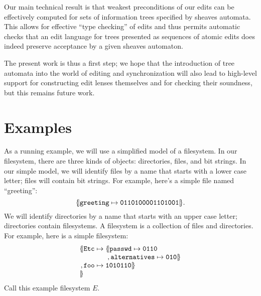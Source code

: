 Our main technical result is that weakest preconditions of our edits
can be effectively computed for sets of information trees specified by
sheaves automata. This allows for effective ``type checking'' of edits
and thus permits automatic checks that an edit language for trees
presented as sequences of atomic edits does indeed preserve acceptance by a
given sheaves automaton.

The present work is thus a first step; we hope that the introduction
of tree automata into the world of editing and synchronization will
also lead to high-level support for constructing edit lenses
themselves and for checking their soundness, but this remains future
work.

\section{Examples}
\label{sec:tree-examples}

As a running example, we will use a simplified model of a filesystem. In our
filesystem, there are three kinds of objects: directories, files, and
bit strings. In our simple model, we will identify files by a name that
starts with a lower case letter; files will contain bit strings. For
example, here's a simple file named ``greeting'':
\[\{\hspace{-2pt}|\mathtt{greeting}\mapsto\mathtt{0110100001101001}|\hspace{-2pt}\}.\]
We will identify directories by a name that starts with an upper case letter;
directories contain filesystems. A filesystem is a collection of files and
directories. For example, here is a simple filesystem:
\[
\begin{array}{c@{}r@{\;}l@{\;}l}
    \Open&\Label{Etc} &\To&\Open\Label{passwd}\To\Label{0110} \\
         &            &   &\;,  \Label{alternatives}\To\Label{010}\Close \\
    ,    &\Label{foo} &\To&\Label{1010110}\Close \\
    \Close
\end{array}
\]
Call this example filesystem $E$.

